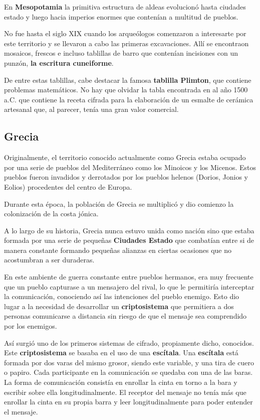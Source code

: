 \documentclass[nochap]{apuntesURJC}
\begin{document}
En \textbf{Mesopotamia} la primitiva estructura de aldeas evolucionó hasta ciudades estado y luego hacia imperios enormes que contenían a multitud de pueblos.

No fue hasta el siglo XIX cuando los arqueólogos comenzaron a interesarte por este territorio y se llevaron a cabo las primeras excavaciones. Allí se encontraon mosaicos, frescos e incluso tablillas de barro que contenían incisiones con un punzón, \textbf{la escritura cuneiforme}.

De entre estas tablillas, cabe destacar la famosa \textbf{tablilla Plimton}, que contiene problemas matemáticos. No hay que olvidar la tabla encontrada en al año 1500 a.C. que contiene la receta cifrada para la elaboración de un esmalte de cerámica artesanal que, al parecer, tenía una gran valor comercial.

\subsection{Grecia}
Originalmente, el territorio conocido actualmente como Grecia estaba ocupado por una serie de pueblos del Mediterráneo como los Minoicos y los Micenos. Estos pueblos fueron invadidos y derrotados por los pueblos helenos (Dorios, Jonios y Eolios) procedentes del centro de Europa.

Durante esta época, la población de Grecia se multiplicó y dio comienzo la colonización de la costa jónica.

A lo largo de su historia, Grecia nunca estuvo unida como nación sino que estaba formada por una serie de pequeñas \textbf{Ciudades Estado} que combatían entre si de manera constante formando pequeñas alianzas en ciertas ocasiones que no acostumbran a ser duraderas.

En este ambiente de guerra constante entre pueblos hermanos, era muy frecuente que un pueblo capturase a un mensajero del rival, lo que le permitiría interceptar la comunicación, conociendo así las intenciones del pueblo enemigo. Esto dio lugar a la necesidad de desarrollar un \textbf{criptosistema} que permitiera a dos personas comunicarse a distancia sin riesgo de que el mensaje sea comprendido por los enemigos.

Así surgió uno de los primeros sistemas de cifrado, propiamente dicho, conocidos. Este \textbf{criptosistema} se basaba en el uso de una \textbf{escítala}. Una \textbf{escítala} está formada por dos varas del mismo grosor, siendo este variable, y una tira de cuero o papiro. Cada participante en la comunicación se quedaba con una de las baras. La forma de comunicación consistía en enrollar la cinta en torno a la bara y escribir sobre ella longitudinalmente. El receptor del mensaje no tenía más que enrollar la cinta en su propia barra y leer longitudinalmente para poder entender el mensaje.
\end{document}
